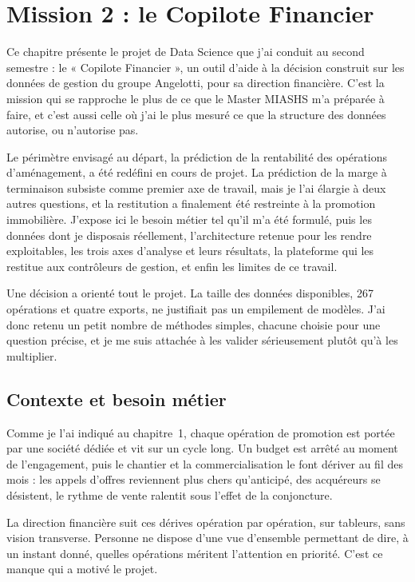 
\chapter{Mission 2 : le Copilote Financier}
\minitoc
\newpage

Ce chapitre présente le projet de Data Science que j'ai conduit au second semestre : le
« Copilote Financier », un outil d'aide à la décision construit sur les données de gestion du
groupe Angelotti, pour sa direction financière. C'est la mission qui se rapproche le plus de ce
que le Master MIASHS m'a préparée à faire, et c'est aussi celle où j'ai le plus mesuré ce que la
structure des données autorise, ou n'autorise pas.

Le périmètre envisagé au départ, la prédiction de la rentabilité des opérations d'aménagement, a
été redéfini en cours de projet. La prédiction de la marge à terminaison subsiste comme premier
axe de travail, mais je l'ai élargie à deux autres questions, et la restitution a finalement été
restreinte à la promotion immobilière. J'expose ici le besoin métier tel qu'il m'a été formulé,
puis les données dont je disposais réellement, l'architecture retenue pour les rendre
exploitables, les trois axes d'analyse et leurs résultats, la plateforme qui les restitue aux
contrôleurs de gestion, et enfin les limites de ce travail.

Une décision a orienté tout le projet. La taille des données disponibles, 267 opérations et
quatre exports, ne justifiait pas un empilement de modèles. J'ai donc retenu un petit nombre de
méthodes simples, chacune choisie pour une question précise, et je me suis attachée à les
valider sérieusement plutôt qu'à les multiplier.

\section{Contexte et besoin métier}

Comme je l'ai indiqué au chapitre~1, chaque opération de promotion est portée par une société
dédiée et vit sur un cycle long. Un budget est arrêté au moment de l'engagement, puis le
chantier et la commercialisation le font dériver au fil des mois : les appels d'offres
reviennent plus chers qu'anticipé, des acquéreurs se désistent, le rythme de vente ralentit sous
l'effet de la conjoncture.

La direction financière suit ces dérives opération par opération, sur tableurs, sans vision
transverse. Personne ne dispose d'une vue d'ensemble permettant de dire, à un instant donné,
quelles opérations méritent l'attention en priorité. C'est ce manque qui a motivé le projet.


